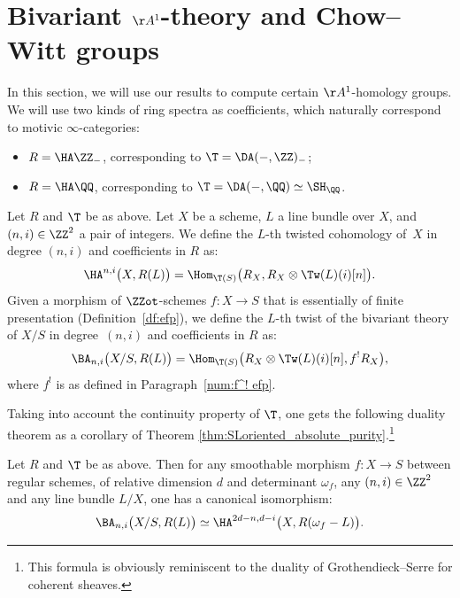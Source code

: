 \section{Bivariant \texorpdfstring{$\AA^1$}{A1}-theory and Chow--Witt groups}
\label{sec:bivariant}

\begin{num}
In this section, we will use our results to compute certain $\AA^1$-homology groups.
We will use two kinds of ring spectra as coefficients,
which naturally correspond to motivic $\infty$-categories:
\begin{itemize}
\item $R=\HA \ZZ_-$, corresponding to $\T=\DA(-,\ZZ)_-$;
\item $R=\HA \QQ$, corresponding to $\T=\DA(-,\QQ) \simeq \SH_\QQ$.
\end{itemize}
\end{num}
\begin{df}\label{df:bivariant_A1}
Let $R$ and $\T$ be as above.
Let $X$ be a scheme, $L$ a line bundle over $X$, and $(n,i) \in\ZZ^2$
a pair of integers.
We define the $L$-th twisted cohomology of~$X$ in degree $(n,i)$ and coefficients in $R$ as:
\[
\HA^{n,i}\big(X,R(L)\big)=\Hom_{\T(S)}\big(R_X,R_X\otimes \Tw(L)(i)[n]\big).
\]
Given a morphism
of $\ZZot$-schemes $f:X \to S$ that is essentially of finite presentation (Definition~\ref{df:efp}),
we define the $L$-th twist of the bivariant theory of $X/S$ in degree~$(n,i)$ and coefficients in $R$
as:
\[
\BA_{n,i}\big(X/S,R(L)\big)=\Hom_{\T(S)}\big(R_X\otimes \Tw(L)(i)[n],f^!R_X\big),
\]
where $f^!$ is as defined in Paragraph~\ref{num:f^! efp}.
\end{df}

Taking into account the continuity property of $\T$,
one gets the following duality theorem as a corollary of Theorem
\ref{thm:SLoriented_absolute_purity}.\footnote{This formula is obviously reminiscent
to the duality of Grothendieck--Serre for coherent sheaves.}
\begin{cor}\label{cor:BM=coh}
Let $R$ and $\T$ be as above.
Then for any smoothable morphism $f:X \to S$
between regular schemes,
of relative dimension $d$ and determinant $\omega_f$,
any $(n,i) \in \ZZ^2$ and any line bundle $L/X$, one has a canonical isomorphism:
\[
\BA_{n,i}\big(X/S,R(L)\big) \simeq \HA^{2d-n,d-i}\big(X,R(\omega_f-L)\big).
\]
\end{cor}

